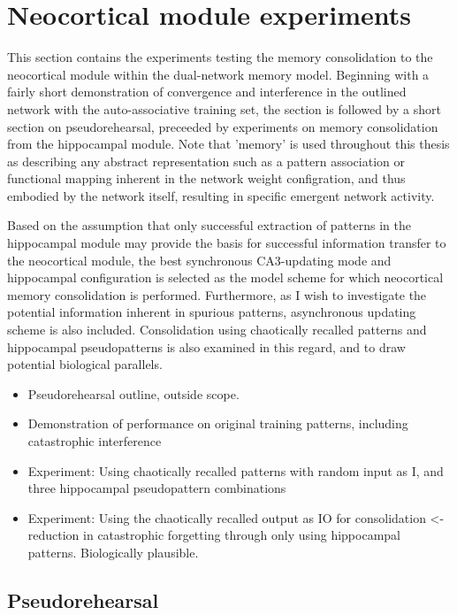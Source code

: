 \section{Neocortical module experiments}

This section contains the experiments testing the memory consolidation to the neocortical module within the dual-network memory model. Beginning with a fairly short demonstration of convergence and interference in the outlined network with the auto-associative training set, the section is followed by a short section on pseudorehearsal, preceeded by experiments on memory consolidation from the hippocampal module. Note that 'memory' is used throughout this thesis as describing any abstract representation such as a pattern association or functional mapping inherent in the network weight configration, and thus embodied by the network itself, resulting in specific emergent network activity.

Based on the assumption that only successful extraction of patterns in the hippocampal module may provide the basis for successful information transfer to the neocortical module, the best synchronous CA3-updating mode and hippocampal configuration is selected as the model scheme for which neocortical memory consolidation is performed. Furthermore, as I wish to investigate the potential information inherent in spurious patterns, asynchronous updating scheme is also included. Consolidation using chaotically recalled patterns and hippocampal pseudopatterns is also examined in this regard, and to draw potential biological parallels.

\begin{itemize}
    \item Pseudorehearsal outline, outside scope.
    \item Demonstration of performance on original training patterns, including catastrophic interference
    \item Experiment: Using chaotically recalled patterns with random input as I, and three hippocampal pseudopattern combinations
    \item Experiment: Using the chaotically recalled output as IO for consolidation <- reduction in catastrophic forgetting through only using hippocampal patterns. Biologically plausible.
\end{itemize}

\subsection{Pseudorehearsal}

